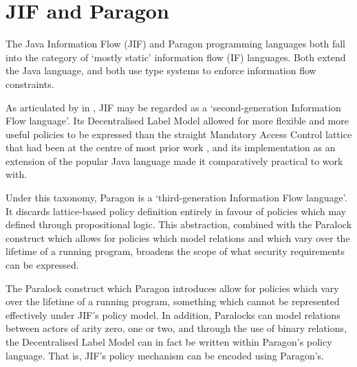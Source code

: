 \chapter{JIF and Paragon} \label{intro_to_jif_para}


The Java Information Flow (JIF) and Paragon programming languages both fall into the category of `mostly static' information flow (IF) languages. Both extend the Java language, and both use type systems to enforce information flow constraints.


As articulated by \citeauthor{broberg2013paragon} in  \cite{broberg2013paragon}, JIF may be regarded as a `second-generation Information Flow language'. Its Decentralised Label Model allowed for more flexible and more useful policies to be expressed than the straight Mandatory Access Control lattice that had been at the centre of most prior work \cite{denning1977certification}, and its implementation as an extension of the popular Java language made it comparatively practical to work with.

Under this taxonomy, Paragon is a `third-generation Information Flow language'. It discards lattice-based policy definition entirely in favour of policies which may defined through propositional logic. This abstraction, combined with the Paralock construct which allows for policies which model relations and which vary over the lifetime of a running program, broadens the scope of what security requirements can be expressed.

The Paralock construct which Paragon introduces allow for policies which vary over the lifetime of a running program, something which cannot be represented effectively under JIF's policy model. In addition, Paralocks can model relations between actors of arity zero, one or two, and through the use of binary relations, the Decentralised Label Model can in fact be written within Paragon's policy language. That is, JIF's policy mechanism can be encoded using Paragon's.

